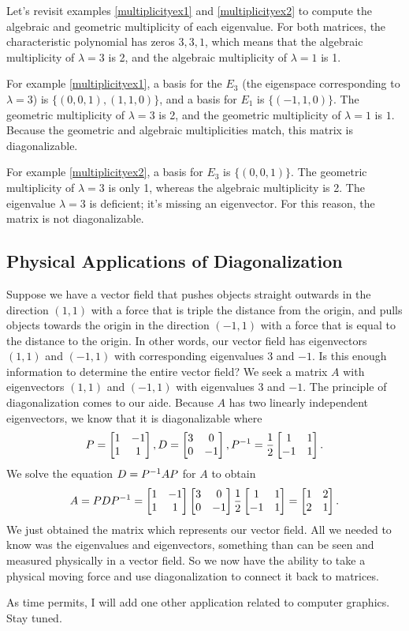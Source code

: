 \begin{example}
Let's revisit examples \ref{multiplicityex1} and  \ref{multiplicityex2} to compute the algebraic and geometric multiplicity of each eigenvalue.  For both matrices, the characteristic polynomial has zeros $3,3,1$, which means that the algebraic multiplicity of $\lambda=3$ is 2, and the algebraic multiplicity of $\lambda=1$ is 1. 

For example \ref{multiplicityex1},
a basis for the $E_3$ (the eigenspace corresponding to $\lambda = 3$) is $\{(0,0,1), (1,1,0)\}$, and a basis for $E_1$ is $\{(-1,1,0)\}$. The geometric multiplicity of $\lambda =3$ is 2, and the geometric multiplicity of $\lambda = 1$ is $1$.  Because the geometric and algebraic multiplicities match, this matrix is diagonalizable.

For example \ref{multiplicityex2}, a basis for $E_3$ is $\{(0,0,1)\}$. The geometric multiplicity of $\lambda = 3$ is only 1, whereas the algebraic multiplicity is 2. The eigenvalue $\lambda=3$ is deficient; it's missing an eigenvector.  For this reason, the matrix is not diagonalizable.
\end{example}

\subsection{Physical Applications of Diagonalization}
Suppose we have a vector field that pushes objects straight outwards in the direction $(1,1)$ with a force that is triple the distance from the origin, and pulls objects towards the origin in the direction $(-1,1)$ with a force that is equal to the distance to the origin. In other words, our vector field has eigenvectors $(1,1)$ and $(-1,1)$ with corresponding eigenvalues $3$ and $-1$. Is this enough information to determine the entire vector field?  We seek a matrix $A$ with eigenvectors $(1,1)$ and $(-1,1)$ with eigenvalues 3 and $-1$.  The principle of diagonalization comes to our aide.  Because $A$ has two linearly independent eigenvectors, we know that it is diagonalizable where $$ P = \begin{bmatrix} 1&-1\\1&1 \end{bmatrix}, D = \begin{bmatrix} 3&0\\0&-1 \end{bmatrix},P^{-1} =\frac12\begin{bmatrix} 1&1\\-1&1 \end{bmatrix}. $$ We solve the equation $D = P^{-1} A P$ for $A$ to obtain 
$$A = PDP^{-1} = \begin{bmatrix} 1&-1\\1&1 \end{bmatrix}\begin{bmatrix} 3&0\\0&-1 \end{bmatrix}\frac12\begin{bmatrix} 1&1\\-1&1 \end{bmatrix} = \begin{bmatrix} 1&2\\2&1 \end{bmatrix}.$$
We just obtained the matrix which represents our vector field. All we needed to know was the eigenvalues and eigenvectors, something than can be seen and measured physically in a vector field. So we now have the ability to take a physical moving force and use diagonalization to connect it back to matrices.  

As time permits, I will add one other application related to computer graphics. Stay tuned.





